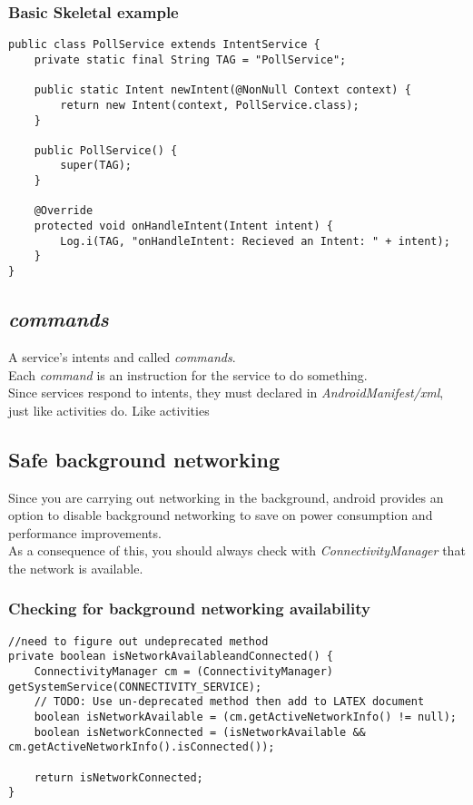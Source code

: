 \documentclass[]{article}
\renewcommand{\it}[1]{\textit{#1}}
\begin{document}
\subsubsection{Basic Skeletal example}
\begin{lstlisting}
public class PollService extends IntentService {
	private static final String TAG = "PollService";
	
	public static Intent newIntent(@NonNull Context context) {
		return new Intent(context, PollService.class);
	}
	
	public PollService() {
		super(TAG);
	}
	
	@Override
	protected void onHandleIntent(Intent intent) {
		Log.i(TAG, "onHandleIntent: Recieved an Intent: " + intent);
	}
}
\end{lstlisting}

\subsection{\it{commands}}
A service's intents and called \it{commands}.  
\\
Each \it{command} is an instruction for the service to do something.
\\
Since services respond to intents, they must declared in \it{AndroidManifest/xml}, just like activities do.
Like activities

\subsection{Safe background networking}
Since you are carrying out networking in the background, android provides an option to disable background networking to save on power consumption and performance improvements.  
\\
As a consequence of this, you should always check with \it{ConnectivityManager} that the network is available.
\subsubsection{Checking for background networking availability}
\begin{lstlisting}
//need to figure out undeprecated method
private boolean isNetworkAvailableandConnected() {
	ConnectivityManager cm = (ConnectivityManager) getSystemService(CONNECTIVITY_SERVICE);
	// TODO: Use un-deprecated method then add to LATEX document
	boolean isNetworkAvailable = (cm.getActiveNetworkInfo() != null);
	boolean isNetworkConnected = (isNetworkAvailable && cm.getActiveNetworkInfo().isConnected());
	
	return isNetworkConnected;
}
\end{lstlisting}
\end{document}

